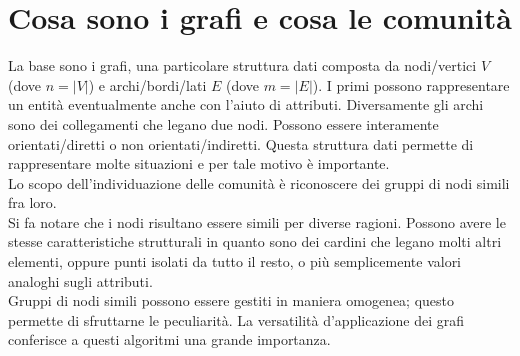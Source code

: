 \section{Cosa sono i grafi e cosa le comunità}
La base sono i grafi, una particolare struttura dati composta da nodi/vertici $V$ (dove $n=|V|$) e archi/bordi/lati $E$ (dove $m=|E|$). I primi possono rappresentare un entità eventualmente anche con l'aiuto di attributi. Diversamente gli archi sono dei collegamenti che legano due nodi. Possono essere interamente orientati/diretti o non orientati/indiretti. Questa struttura dati permette di rappresentare molte situazioni e per tale motivo è importante.\\
Lo scopo dell'individuazione delle comunità è riconoscere dei gruppi di nodi simili fra loro.\\
Si fa notare che i nodi risultano essere simili per diverse ragioni. Possono avere le stesse caratteristiche strutturali in quanto sono dei cardini che legano molti altri elementi, oppure punti isolati da tutto il resto, o più semplicemente  valori analoghi sugli attributi.\\
Gruppi di nodi simili possono essere gestiti in maniera omogenea; questo permette di sfruttarne le peculiarità. La versatilità d'applicazione dei grafi conferisce a questi algoritmi una grande importanza.
%
